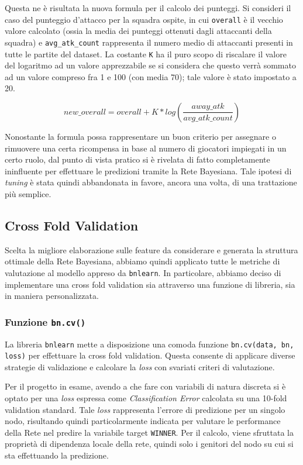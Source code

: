 \documentclass[hidelinks, 12pt]{article}
\begin{document}
Questa ne è risultata la nuova formula per il calcolo dei punteggi. Si consideri il caso del punteggio d'attacco per la squadra ospite, in cui \texttt{overall} è il vecchio valore calcolato (ossia la media dei punteggi ottenuti dagli attaccanti della squadra) e \texttt{avg\_atk\_count} rappresenta il numero medio di attaccanti presenti in tutte le partite del dataset. La costante \texttt{K} ha il puro scopo di riscalare il valore del logaritmo ad un valore apprezzabile se si considera che questo verrà sommato ad un valore compreso fra 1 e 100 (con media 70); tale valore è stato impostato a 20.

$$
new\_overall = overall + K*log(\frac{away\_atk}{avg\_atk\_count})
$$

Nonostante la formula possa rappresentare un buon criterio per assegnare o rimuovere una certa ricompensa in base al numero di giocatori impiegati in un certo ruolo, dal punto di vista pratico si è rivelata di fatto completamente ininfluente per effettuare le predizioni tramite la Rete Bayesiana. Tale ipotesi di \textit{tuning} è stata quindi abbandonata in favore, ancora una volta, di una trattazione più semplice.



\subsection{Cross Fold Validation}
\label{sec:perf-cross-fold}

Scelta la migliore elaborazione sulle feature da considerare e generata la struttura ottimale della Rete Bayesiana, abbiamo quindi applicato tutte le metriche di valutazione al modello appreso da \texttt{bnlearn}. In particolare, abbiamo deciso di implementare una cross fold validation sia attraverso una funzione di libreria, sia in maniera personalizzata.


\subsubsection{Funzione \texttt{bn.cv()}}

La libreria \texttt{bnlearn} mette a disposizione una comoda funzione \texttt{bn.cv(data, bn, loss)} per effettuare la cross fold validation. Questa consente di applicare diverse strategie di validazione e calcolare la \textit{loss} con svariati criteri di valutazione.

Per il progetto in esame, avendo a che fare con variabili di natura discreta si è optato per una \textit{loss} espressa come \textit{Classification Error} calcolata su una 10-fold validation standard. Tale \textit{loss} rappresenta l'errore di predizione per un singolo nodo, risultando quindi particolarmente indicata per valutare le performance della Rete nel predire la variabile target \texttt{WINNER}. Per il calcolo, viene sfruttata la proprietà di dipendenza locale della rete, quindi solo i genitori del nodo su cui si sta effettuando la predizione.
\end{document}

